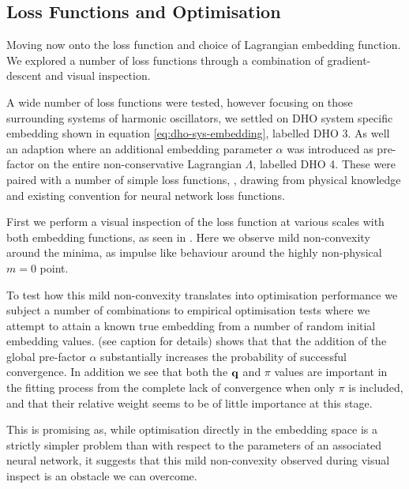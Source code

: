 \subsection{Loss Functions and Optimisation}
\label{sec:res-lf}

Moving now onto the loss function and choice of Lagrangian embedding function. We explored a number of loss functions through a combination of gradient-descent and visual inspection.

A wide number of loss functions were tested, however focusing on those surrounding systems of harmonic oscillators, we settled on DHO system specific embedding shown in equation \eqref{eq:dho-sys-embedding}, labelled DHO 3.
As well an adaption where an additional embedding parameter $\alpha$ was introduced as pre-factor on the entire non-conservative Lagrangian $\Lambda$, labelled DHO 4. 
These were paired with a number of simple loss functions, , drawing from physical knowledge and existing convention for neural network loss functions.

First we perform a visual inspection of the  loss function at various scales with both embedding functions, as seen in . Here we observe mild non-convexity around the minima, as impulse like behaviour around the highly non-physical $m = 0$ point.

To test how this mild non-convexity translates into optimisation performance we subject a number of combinations to empirical optimisation tests where we attempt to attain a known true embedding from a number of random initial embedding values.  (see caption for details) shows that that the addition of the global pre-factor $\alpha$ substantially increases the probability of successful convergence.  In addition we see that both the $\vb{q}$ and $\pi$ values are important in the fitting process from the complete lack of convergence when only $\pi$ is included, and that their relative weight seems to be of little importance at this stage.

This is promising as, while optimisation directly in the embedding space is a strictly simpler problem than with respect to the parameters of an associated neural network, it suggests that this mild non-convexity observed during visual inspect is an obstacle we can overcome.


